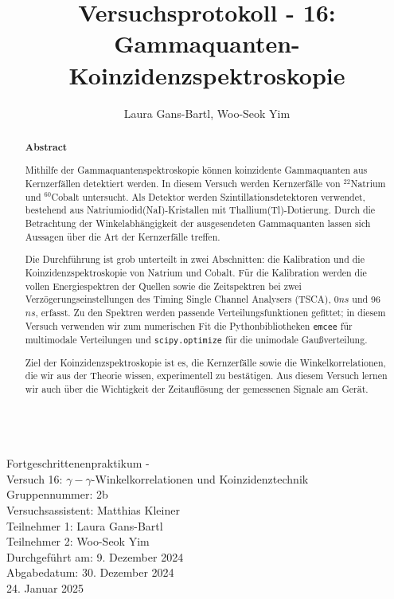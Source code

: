\documentclass[%
aps,
onecolumn,
11pt,
tightenlines,
nofootinbib,
superscriptaddress,
floatfix,
prd,
]{revtex4-2}
\begin{document}
\title{\large Versuchsprotokoll - 16: Gammaquanten-Koinzidenzspektroskopie}

\author{Laura Gans-Bartl, Woo-Seok Yim}

\begin{abstract} 
	\vs{3mm}
	\centering
\begin{tcolorbox}
	\begin{center}		
		\textbf{Abstract}
	\end{center}\par
Mithilfe der Gammaquantenspektroskopie können koinzidente Gammaquanten aus Kernzerfällen detektiert werden. In diesem Versuch werden Kernzerfälle von $^{22}$Natrium und $^{60}$Cobalt untersucht. Als Detektor werden Szintillationsdetektoren verwendet, bestehend aus Natriumiodid(NaI)-Kristallen mit Thallium(Tl)-Dotierung. Durch die Betrachtung der Winkelabhängigkeit der ausgesendeten Gammaquanten lassen sich Aussagen über die Art der Kernzerfälle treffen.\par 
Die Durchführung ist grob unterteilt in zwei Abschnitten: die Kalibration und die Koinzidenzspektroskopie von Natrium und Cobalt. Für die Kalibration werden die vollen Energiespektren der Quellen sowie die Zeitspektren bei zwei Verzögerungseinstellungen des Timing Single Channel Analysers (TSCA), 0$ns$ und 96$ns$, erfasst. Zu den Spektren werden passende Verteilungsfunktionen gefittet; in diesem Versuch verwenden wir zum numerischen Fit die Pythonbibliotheken \texttt{emcee} für multimodale Verteilungen und \texttt{scipy.optimize} für die unimodale Gaußverteilung.\par
Ziel der Koinzidenzspektroskopie ist es, die Kernzerfälle sowie die Winkelkorrelationen, die wir aus der Theorie wissen, experimentell zu bestätigen. Aus diesem Versuch lernen wir auch über die Wichtigkeit der Zeitauflösung der gemessenen Signale am Gerät.
\end{tcolorbox}
\end{abstract}
\begin{center}
	\\
	{\fontsize{20}{10}\selectfont Fortgeschrittenenpraktikum - \\[5mm]
	Versuch 16: $\gamma - \gamma$-Winkelkorrelationen und Koinzidenztechnik\\ [10mm]
	Gruppennummer: 2b\\[5mm]
	Versuchsassistent: Matthias Kleiner\\[5mm]
	Teilnehmer 1: Laura Gans-Bartl \\[5mm]
	Teilnehmer 2: Woo-Seok Yim \\[5mm]
	Durchgeführt am: 9. Dezember 2024 \\[5mm]
	Abgabedatum: 30. Dezember 2024 \\
		\hspace{100pt} 24. Januar 2025}
\end{center}
\newpage
\maketitle
\newpage
\tableofcontents
\newpage
\end{document}
